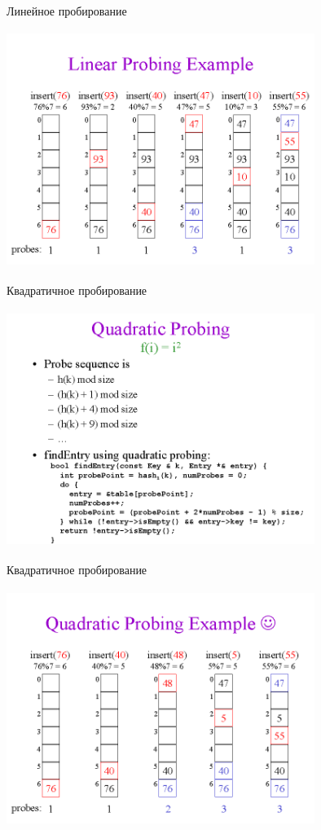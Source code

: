 \documentclass[10pt]{beamer}
\begin{document}
\begin{frame}[fragile]{Линейное пробирование}
\begin{center}
    \includegraphics[width=10cm, height=7.7cm]{Term_1/Source/Pirctures/img015.png}
\end{center}
\end{frame}

\begin{frame}[fragile]{Квадратичное пробирование}
\begin{center}
    \includegraphics[width=10cm, height=7.7cm]{Term_1/Source/Pirctures/img017.png}
\end{center}
\end{frame}

\begin{frame}[fragile]{Квадратичное пробирование}
\begin{center}
    \includegraphics[width=10cm, height=7.7cm]{Term_1/Source/Pirctures/img018.png}
\end{center}
\end{frame}
\end{document}
